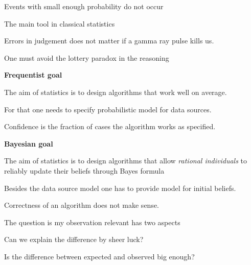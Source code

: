 \documentclass[landscape,footrule]{foils}
\begin{document}

Events with small enough probability do not occur
\begin{triangles}
\item The main tool in classical statistics 
\item Errors in judgement does not matter if a gamma ray pulse kills us.
\item One must avoid the lottery paradox in the reasoning
\end{triangles}



\textbf{Frequentist goal}
\begin{triangles}
\item The aim of statistics is to design algorithms that work well on average.
\item For that one needs to specify probabilistic model for data sources.
\item Confidence is the fraction of cases the algorithm works as specified.
\end{triangles}
\vspace*{2cm}

\textbf{Bayesian goal}
\begin{triangles}
\item The aim of statistics is to design algorithms that allow \emph{rational individuals} to reliably update their beliefs through Bayes formula
\item Besides the data source model one has to provide model for initial beliefs.
\item Correctness of an algorithm does not make sense.
\end{triangles}



\vspace*{1ex}
\vspace*{-2ex}
The question is my observation relevant has two aspects
\begin{triangles}
\item Can we explain the difference by sheer luck? 
\item Is the difference between expected and observed big enough?
\end{triangles}
\end{document}

